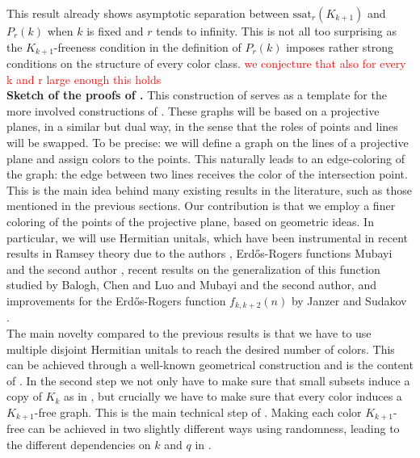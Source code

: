 \documentclass[12pt]{article}
\newcommand{\red}[1]{\textcolor{red}{#1}}
\theoremstyle{definition}
\begin{document}
	This result already shows asymptotic separation between $\mathrm{ssat}_r(K_{k+1})$ and $P_r(k)$ when $k$ is fixed and $r$ tends to infinity. This is not all too surprising as the $K_{k+1}$-freeness condition in the definition of $P_r(k)$ imposes rather strong conditions on the structure of every color class. \red{we conjecture that also for every k and r large enough this holds} \\
	
	\textbf{Sketch of the proofs of .}
	This construction of  serves as a template for the more involved constructions of . These graphs will be based on a projective planes, in a similar but dual way, in the sense that the roles of points and lines will be swapped. To be precise: we will define a graph on the lines of a projective plane and assign colors to the points. This naturally leads to an edge-coloring of the graph: the edge between two lines receives the color of the intersection point. This is the main idea behind many existing results in the literature, such as those mentioned in the previous sections. Our contribution is that we employ a finer coloring of the points of the projective plane, based on geometric ideas. In particular, we will use Hermitian unitals, which have been instrumental in recent results in Ramsey theory due to the authors \cite{mattheus2024asymptotics}, Erd\H{o}s-Rogers functions Mubayi and the second author \cite{mubayi2024order}, recent results on the generalization of this function studied by Balogh, Chen and Luo \cite{BCL24} and Mubayi and the second author, and improvements for the Erd\H{o}s-Rogers function $f_{k,k+2}(n)$ by Janzer and Sudakov \cite{JS23}. \\
	
	The main novelty compared to the previous results is that we have to use multiple disjoint Hermitian unitals to reach the desired number of colors. This can be achieved through a well-known geometrical construction and is the content of . In the second step we not only have to make sure that small subsets induce a copy of $K_k$ as in , but crucially we have to make sure that every color induces a $K_{k+1}$-free graph. This is the main technical step of . Making each color $K_{k+1}$-free can be achieved in two slightly different ways using randomness, leading to the different dependencies on $k$ and $q$ in .
	
\end{document}
